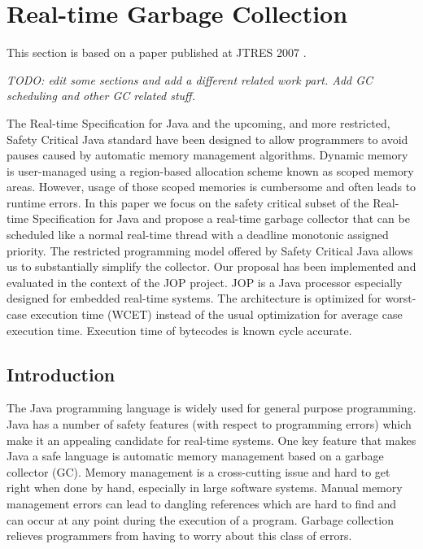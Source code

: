 \section{Real-time Garbage Collection}


This section is based on a paper published at JTRES 2007
\cite{jop:scjgc}.

\emph{TODO: edit some sections and add a different related work
part. Add GC scheduling and other GC related stuff.}

The Real-time Specification for Java and the upcoming, and more
restricted, Safety Critical Java standard have been designed to
allow programmers to avoid pauses caused by automatic memory
management algorithms.  Dynamic memory is user-managed using a
region-based allocation scheme known as scoped memory areas.
However, usage of those scoped memories is cumbersome and often
leads to runtime errors. In this paper we focus on the safety
critical subset of the Real-time Specification for Java and propose
a real-time garbage collector that can be scheduled like a normal
real-time thread with a deadline monotonic assigned priority.  The
restricted programming model offered by Safety Critical Java allows
us to substantially simplify the collector. Our proposal has been
implemented and evaluated in the context of the JOP project. JOP is
a Java processor especially designed for embedded real-time systems.
The architecture is optimized for worst-case execution time (WCET)
instead of the usual optimization for average case execution time.
Execution time of bytecodes is known cycle accurate.

\subsection{Introduction}

The Java programming language is widely used for general purpose
programming. Java has a number of safety features (with respect to
programming errors) which make it an appealing candidate for real-time
systems.  One key feature that makes Java a safe language is automatic
memory management based on a garbage collector (GC).  Memory management is a
cross-cutting issue and hard to get right when done by hand, especially in
large software systems.  Manual memory management errors can lead to
dangling references which are hard to find and can occur at any point during
the execution of a program. Garbage collection relieves programmers from
having to worry about this class of errors.

